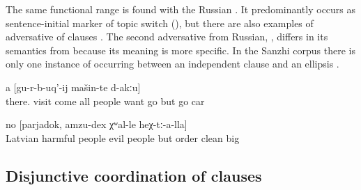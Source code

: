 The same functional range is found with the Russian   . It predominantly occurs as sentence-initial marker of topic switch (), but there are also examples of adversative  of clauses . The second adversative  from Russian,  , differs in its semantics from  because its meaning is more specific. In the Sanzhi corpus there is only one instance of  occurring between an independent clause and an ellipsis .
%
\begin{exe}
	\ex	\label{ex:‎There all the people who came want to leave, but there are no cars to leave}
	\gll	[hextːu-b	šːatːir	sa-b-ač'-ib-te	li<b>il=ra	χalq'	b-ikː-ul	ca-b	gu-r-b-uq'-aˁnaj]		a	[gu-r-b-uq'-ij	mašin-te	d-akːu]\\
		there.	visit	come 	all	people	want		go	but	go	car	\\
	\glt	{}

	\ex	\label{ex:‎‎‎The Latvian people were harmful, they were bad people, but order, cleanness is great among them}
	\gll	[latiši	wredni	χalq'=de,	wahi	χalq'=de]	no	[parjadok,	amzu-dex	χʷal-le	heχ-tː-a-lla]\\
		Latvian	harmful	people	evil	people	but	order	clean	big	\\
	\glt	{}
\end{exe}



\subsection{Disjunctive coordination of clauses}
\label{ssec:Disjunctive coordination of clauses}

